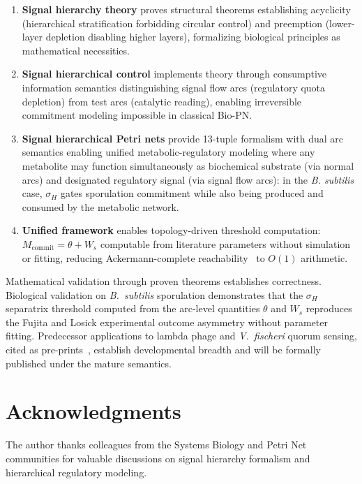 \documentclass[10pt,letterpaper]{article}
\begin{document}
\begin{enumerate}
\item \textbf{Signal hierarchy theory} proves structural theorems establishing acyclicity (hierarchical stratification forbidding circular control) and preemption (lower-layer depletion disabling higher layers), formalizing biological principles as mathematical necessities.

\item \textbf{Signal hierarchical control} implements theory through consumptive information semantics distinguishing signal flow arcs (regulatory quota depletion) from test arcs (catalytic reading), enabling irreversible commitment modeling impossible in classical Bio-PN.

\item \textbf{Signal hierarchical Petri nets} provide 13-tuple formalism with dual arc semantics enabling unified metabolic-regulatory modeling where any metabolite may function simultaneously as biochemical substrate (via normal arcs) and designated regulatory signal (via signal flow arcs): in the \textit{B. subtilis} case, $\sigma_H$ gates sporulation commitment while also being produced and consumed by the metabolic network.

\item \textbf{Unified framework} enables topology-driven threshold computation: $M_{\text{commit}} = \theta + W_s$ computable from literature parameters without simulation or fitting, reducing Ackermann-complete reachability~\cite{czerwinski2021} to $O(1)$ arithmetic.
\end{enumerate}

Mathematical validation through proven theorems establishes correctness. Biological validation on \textit{B.\ subtilis} sporulation demonstrates that the $\sigma_H$ separatrix threshold computed from the arc-level quantities $\theta$ and $W_s$ reproduces the Fujita and Losick experimental outcome asymmetry without parameter fitting. Predecessor applications to lambda phage and \textit{V.\ fischeri} quorum sensing, cited as pre-prints~\cite{simao2024hierarchical,simao2025unifying}, establish developmental breadth and will be formally published under the mature semantics.

\section*{Acknowledgments}

The author thanks colleagues from the Systems Biology and Petri Net communities for valuable discussions on signal hierarchy formalism and hierarchical regulatory modeling.
\end{document}
